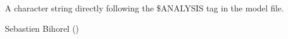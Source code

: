 \begin{Arguments}
\begin{ldescription}
\begin{description}
\end{description}


\item[\code{analysis}] A character string directly following the \$ANALYSIS tag in the
model file.
\end{ldescription}
\end{Arguments}
%
\begin{Author}\relax
Sebastien Bihorel ()
\end{Author}
%
\begin{SeeAlso}\relax
{}
\end{SeeAlso}
